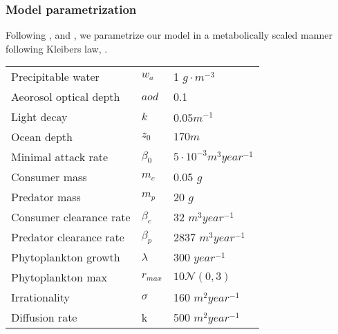 \subsubsection*{Model parametrization}
Following \citep{yodzis1991}, and \citep{kha_2019}, we parametrize our model in a metabolically scaled manner following Kleibers law, \citep{kleiber}.



\begin{tabular}{l | l | l}
  Precipitable water & $w_a$ & 1 $g \cdot m^{-3}$\\
  Aeorosol optical depth & $aod$ & 0.1 \\
  Light decay & $k$ & $0.05 m^{-1}$\\
  Ocean depth & $z_0$ & $170 m$ \\
  Minimal attack rate & $\beta_0$ & $5 \cdot 10^{-3} m^{3} year^{-1}$ \\
  Consumer mass & $m_c$ & 0.05 $g$ \\
  Predator mass & $m_p$ & 20 $g$ \\
  Consumer clearance rate & $\beta_c$ & 32 $m^{3} year^{-1}$ \\
  Predator clearance rate & $\beta_p$ & 2837 $m^3 year^{-1}$ \\
  Phytoplankton growth & $\lambda$ & 300 $year^{-1}$ \\
  Phytoplankton max & $r_{max}$ & $10\mathcal{N}(0,3)$ \\
  Irrationality & $\sigma$ & 160 $m^2 year^{-1}$ \\
  Diffusion rate & k & 500 $m^{2} year^{-1}$
\end{tabular}
